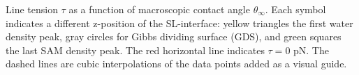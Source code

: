 \label{fig:Tau-vs-MacAngle}Line tension $\tau$ as a function of
macroscopic contact angle $\theta_{\infty}$. Each symbol indicates
a different z-position of the SL-interface: yellow triangles the first
water density peak, gray circles for Gibbs dividing surface (GDS),
and green squares the last SAM density peak. The red horizontal line
indicates $\tau=0$ pN. The dashed lines are cubic interpolations
of the data points added as a visual guide. 